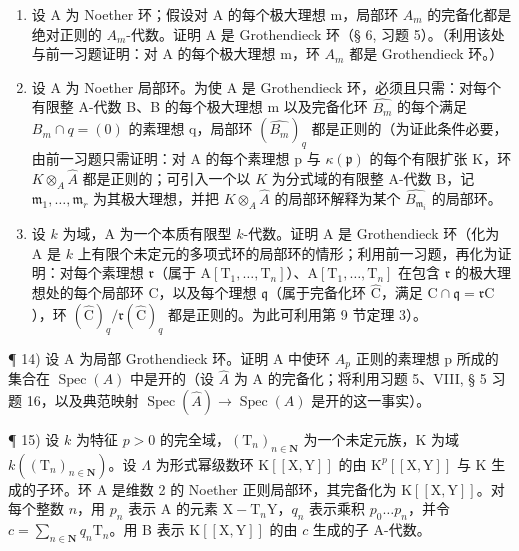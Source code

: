 \begin{enumerate}
\def\labelenumi{\arabic{enumi})}
\setcounter{enumi}{10}
\item
  设 A 为 Noether 环；假设对 A 的每个极大理想 m，局部环 \(A_{m}\) 的完备化都是绝对正则的 \(A_{m}\)-代数。证明 A 是 Grothendieck 环（§ 6, 习题 5）。（利用该处与前一习题证明：对 A 的每个极大理想 m，环 \(A_{m}\) 都是 Grothendieck 环。）
\item
  设 A 为 Noether 局部环。为使 A 是 Grothendieck 环，必须且只需：对每个有限整 A-代数 B、B 的每个极大理想 m 以及完备化环 \(\widehat{B_{m}}\) 的每个满足 \(B_{m} \cap q = (0)\) 的素理想 q，局部环 \((\widehat{B_{m}})_{q}\) 都是正则的（为证此条件必要，由前一习题只需证明：对 A 的每个素理想 p 与 \(\kappa(\mathfrak{p})\) 的每个有限扩张 K，环 \(K \otimes_{A} \widehat{A}\) 都是正则的；可引入一个以 \(K\) 为分式域的有限整 A-代数 B，记 \(\mathfrak{m}_{1},\ldots,\mathfrak{m}_{r}\) 为其极大理想，并把 \(K\otimes_{A}\widehat{A}\) 的局部环解释为某个 \(\widehat{B_{\mathfrak{m}_{i}}}\) 的局部环。
\item
  设 \(k\) 为域，A 为一个本质有限型 \(k\)-代数。证明 A 是 Grothendieck 环（化为 A 是 \(k\) 上有限个未定元的多项式环的局部环的情形；利用前一习题，再化为证明：对每个素理想 \(\mathfrak{r}\)（属于 \(\mathrm{A}[\mathrm{T}_1,\ldots ,\mathrm{T}_n]\)）、\(\mathrm{A}[\mathrm{T}_1,\ldots ,\mathrm{T}_n]\) 在包含 \(\mathfrak{r}\) 的极大理想处的每个局部环 C，以及每个理想 \(\mathfrak{q}\)（属于完备化环 \(\widehat{\mathrm{C}}\)，满足 \(\mathrm{C}\cap \mathfrak{q} = \mathfrak{r}\mathrm{C}\)），环 \((\widehat{\mathrm{C}})_q / \mathfrak{r}(\widehat{\mathrm{C}})_q\) 都是正则的。为此可利用第 9 节定理 3）。
\end{enumerate}

¶ 14) 设 A 为局部 Grothendieck 环。证明 A 中使环 \(A_{p}\) 正则的素理想 p 所成的集合在 \(\operatorname{Spec}(A)\) 中是开的（设 \(\widehat{A}\) 为 A 的完备化；将利用习题 5、VIII, § 5 习题 16，以及典范映射 \(\operatorname{Spec}(\widehat{A}) \to \operatorname{Spec}(A)\) 是开的这一事实）。

¶ 15) 设 \(k\) 为特征 \(p > 0\) 的完全域，\((\mathrm{T}_{n})_{n \in \mathbf{N}}\) 为一个未定元族，K 为域 \(k((\mathrm{T}_{n})_{n \in \mathbf{N}})\)。设 \(\Lambda\) 为形式幂级数环 \(\mathrm{K}[[\mathrm{X},\mathrm{Y}]]\) 的由 \(\mathrm{K}^{p}[[\mathrm{X},\mathrm{Y}]]\) 与 K 生成的子环。环 A 是维数 2 的 Noether 正则局部环，其完备化为 \(\mathrm{K}[[\mathrm{X},\mathrm{Y}]]\)。对每个整数 \(n\)，用 \(p_{n}\) 表示 A 的元素 \(\mathrm{X} - \mathrm{T}_{n}\mathrm{Y}\)，\(q_{n}\) 表示乘积 \(p_{0} \ldots p_{n}\)，并令 \(c = \sum_{n \in \mathbf{N}} q_{n}\mathrm{T}_{n}\)。用 B 表示 \(\mathrm{K}[[\mathrm{X},\mathrm{Y}]]\) 的由 \(c\) 生成的子 A-代数。

